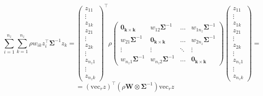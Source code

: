 \documentclass{article}
\begin{document}
$$
 \sum_{i=1}^{n_z} \sum_{k=1}^{n_z} \rho w_{ik} z^{\top}_i \boldsymbol{\Sigma}^{-1} z_k = 
\begin{pmatrix}
z_{11} \\ \vdots \\ z_{1k} \\ z_{21} \\ \vdots \\ z_{2k} \\ \vdots \\z_{n_z1} \\ \vdots \\ z_{n_zk}
\end{pmatrix}^{\top}\rho
\begin{pmatrix}
\boldsymbol{0_{k \times k}} & w_{12} \boldsymbol{\Sigma}^{-1} & \ldots & w_{1n_z} \boldsymbol{\Sigma}^{-1}\\
w_{21} \boldsymbol{\Sigma}^{-1} & \boldsymbol{0_{k \times k}} & \ldots & w_{2n_z} \boldsymbol{\Sigma}^{-1}\\
\vdots & \vdots & \ddots & \vdots \\
w_{n_z1} \boldsymbol{\Sigma}^{-1} & w_{n_z2} \boldsymbol{\Sigma}^{-1} & \ldots & \boldsymbol{0_{k \times k}}
\end{pmatrix}
\begin{pmatrix}
z_{11} \\ \vdots \\ z_{1k} \\ z_{21} \\ \vdots \\ z_{2k} \\ \vdots \\z_{n_z1} \\ \vdots \\ z_{n_zk}
\end{pmatrix}  = 
$$
$$
=(\mathrm{vec}_r z) ^{\top} \left( \rho \boldsymbol{W} \otimes \boldsymbol{\Sigma}^{-1} \right) \mathrm{vec}_r z
$$
\end{document}
